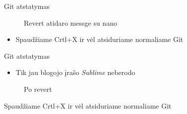 \documentclass[11pt,xcolor=table]{beamer}
\begin{document}
\begin{frame}[fragile]{Git atstatymas}
\begin{figure}
\caption{Revert atidaro messge su nano}
\end{figure}
\begin{itemize}
\item Spaudžiame Crtl+X ir vėl atsiduriame normaliame Git
\end{itemize}
\end{frame}


\begin{frame}[fragile]{Git atstatymas}
\begin{itemize}
\item Tik jau blogojo įrašo \textit{Sublime} neberodo
\end{itemize}
\begin{figure}
\caption{Po revert}
\end{figure}
Spaudžiame Crtl+X ir vėl atsiduriame normaliame Git
\end{frame}


\end{document}
